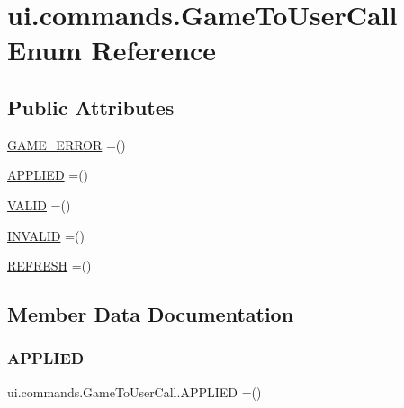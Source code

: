 \hypertarget{enumui_1_1commands_1_1_game_to_user_call}{}\section{ui.\+commands.\+Game\+To\+User\+Call Enum Reference}
\label{enumui_1_1commands_1_1_game_to_user_call}
\subsection*{Public Attributes}
\begin{DoxyCompactItemize}
\item 
\mbox{\hyperlink{enumui_1_1commands_1_1_game_to_user_call_a77e5605bf064eac7764f1cc3387cbb6a}{G\+A\+M\+E\+\_\+\+E\+R\+R\+OR}} =()
\item 
\mbox{\hyperlink{enumui_1_1commands_1_1_game_to_user_call_a1e4f602abae0d61ee6d406806b55f3f6}{A\+P\+P\+L\+I\+ED}} =()
\item 
\mbox{\hyperlink{enumui_1_1commands_1_1_game_to_user_call_a4c3ca908c2c8605b0927ccfb5f4a7958}{V\+A\+L\+ID}} =()
\item 
\mbox{\hyperlink{enumui_1_1commands_1_1_game_to_user_call_adac2df0cc85783554a76bdfa312705c8}{I\+N\+V\+A\+L\+ID}} =()
\item 
\mbox{\hyperlink{enumui_1_1commands_1_1_game_to_user_call_a203dee55bb4b42a966538d1b5ce4addb}{R\+E\+F\+R\+E\+SH}} =()
\end{DoxyCompactItemize}


\subsection{Member Data Documentation}
\mbox{\label{enumui_1_1commands_1_1_game_to_user_call_a1e4f602abae0d61ee6d406806b55f3f6}} 
\subsubsection{\texorpdfstring{A\+P\+P\+L\+I\+ED}{APPLIED}}
{\footnotesize\ttfamily ui.\+commands.\+Game\+To\+User\+Call.\+A\+P\+P\+L\+I\+ED =()}

\mbox{\label{enumui_1_1commands_1_1_game_to_user_call_a77e5605bf064eac7764f1cc3387cbb6a}} 
